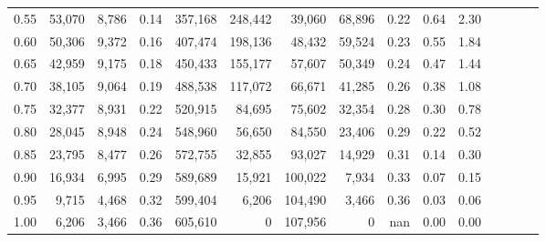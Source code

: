 \begin{tabular}{rrrcrrrrrrrrrrr}
0.55 &  53,070 &  8,786 &                                       0.14 &  357,168 &  248,442 &   39,060 &   68,896 &  0.22 &  0.64 &                         2.30 \\
0.60 &  50,306 &  9,372 &                                       0.16 &  407,474 &  198,136 &   48,432 &   59,524 &  0.23 &  0.55 &                         1.84 \\
0.65 &  42,959 &  9,175 &                                       0.18 &  450,433 &  155,177 &   57,607 &   50,349 &  0.24 &  0.47 &                         1.44 \\
0.70 &  38,105 &  9,064 &                                       0.19 &  488,538 &  117,072 &   66,671 &   41,285 &  0.26 &  0.38 &                         1.08 \\
0.75 &  32,377 &  8,931 &                                       0.22 &  520,915 &   84,695 &   75,602 &   32,354 &  0.28 &  0.30 &                         0.78 \\
0.80 &  28,045 &  8,948 &                                       0.24 &  548,960 &   56,650 &   84,550 &   23,406 &  0.29 &  0.22 &                         0.52 \\
0.85 &  23,795 &  8,477 &                                       0.26 &  572,755 &   32,855 &   93,027 &   14,929 &  0.31 &  0.14 &                         0.30 \\
0.90 &  16,934 &  6,995 &                                       0.29 &  589,689 &   15,921 &  100,022 &    7,934 &  0.33 &  0.07 &                         0.15 \\
0.95 &   9,715 &  4,468 &                                       0.32 &  599,404 &    6,206 &  104,490 &    3,466 &  0.36 &  0.03 &                         0.06 \\
1.00 &   6,206 &  3,466 &                                       0.36 &  605,610 &        0 &  107,956 &        0 &   nan &  0.00 &                         0.00 \\
\bottomrule
\end{tabular}
